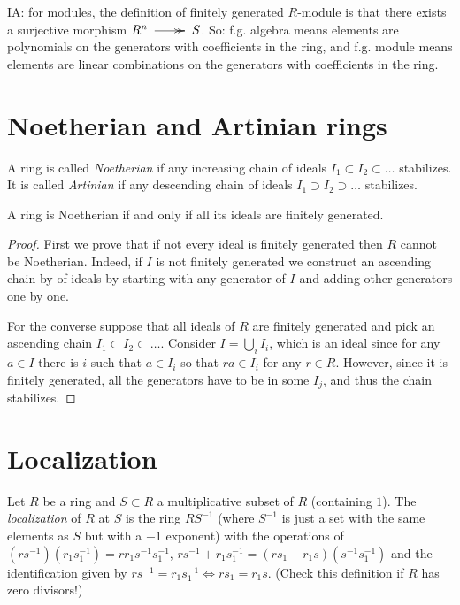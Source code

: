 IA: for modules, the definition of finitely generated $R$-module
is that there exists a surjective morphism $R^n \xymatrix{\ar@{->>}[r]&} S$.
So: f.g. algebra means elements are polynomials 
on the generators with coefficients in the ring,
and f.g. module means elements are linear combinations
on the generators with coefficients in the ring.

\section{Noetherian and Artinian rings}
\label{section-noetherian-and-artinian-rings}

\begin{definition}
\label{definition-noetherian-and-artinian-rings}
A ring is called {\it Noetherian} 
if any increasing chain of ideals $I_1 \subset I_2 \subset…$
stabilizes. It is called {\it Artinian} 
if any descending chain of ideals $I_1 \supset I_2\supset…$
stabilizes.
\end{definition}

\begin{exercise}
\label{exercise-noetherian-iff-ideals-are-finitely-generated}
A ring is Noetherian if and only if all its ideals are finitely generated.
\end{exercise}

\begin{proof}
First we prove that if not every ideal is finitely generated
then $R$ cannot be Noetherian.
Indeed, if $I$ is not finitely generated
we construct an ascending chain by of ideals by starting with
any generator of $I$ and adding other generators one by one.

For the converse suppose that all ideals of $R$ are finitely generated
and pick an ascending chain $I_1\subset I_2\subset…$.
Consider $I=\bigcup_i I_i$,
which is an ideal since for any $a \in I$
there is $i$ such that $a \in I_i$
so that $ra \in I_i$ for any $r \in R$.
However, since it is finitely generated,
all the generators have to be in some $I_j$,
and thus the chain stabilizes.
\end{proof}
\section{Localization}
\label{section-localization}

\begin{definition}
\label{definition-localization}
Let $R$ be a ring and $S \subset R$ 
a multiplicative subset of $R$ (containing $1$).
The {\it localization} of $R$ at $S$ 
is the ring $RS^{-1}$ 
(where $S^{-1}$ is just a set with
the same elements as $S$ but with a $-1$ exponent)
with the operations of $(rs^{-1})(r_1s_1^{-1})=rr_1s^{-1}s_1^{-1}$,
$rs^{-1}+r_1s_1^{-1}=(rs_1+r_1s)(s^{-1}s^{-1}_1)$
and the identification given by
$rs^{-1}=r_1s_1^{-1} \iff rs_1=r_1s$.
(Check this definition if $R$ has zero divisors!)
\end{definition}

